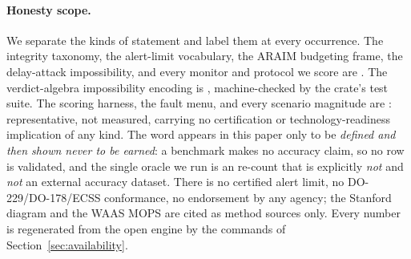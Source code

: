 \paragraph{Honesty scope.}
We separate the kinds of statement and label them at every occurrence. The
integrity taxonomy, the alert-limit vocabulary, the ARAIM budgeting frame, the
delay-attack impossibility, and every monitor and protocol we score are
\Cited{}. The verdict-algebra impossibility encoding is \Proven{}, machine-checked
by the crate's test suite. The scoring harness, the fault menu, and every scenario
magnitude are \Modelled{}: representative, not measured, carrying no certification
or technology-readiness implication of any kind. The word \Validated{} appears in
this paper only to be \emph{defined and then shown never to be earned}: a benchmark
makes no accuracy claim, so no row is validated, and the single oracle we run is an
 re-count that is explicitly \emph{not} \Validated{} and
\emph{not} an external accuracy dataset. There is no certified alert limit, no
DO-229/DO-178/ECSS conformance, no endorsement by any agency; the Stanford diagram
and the WAAS MOPS are cited as method sources only. Every number is regenerated
from the open engine by the commands of Section~\ref{sec:availability}.
